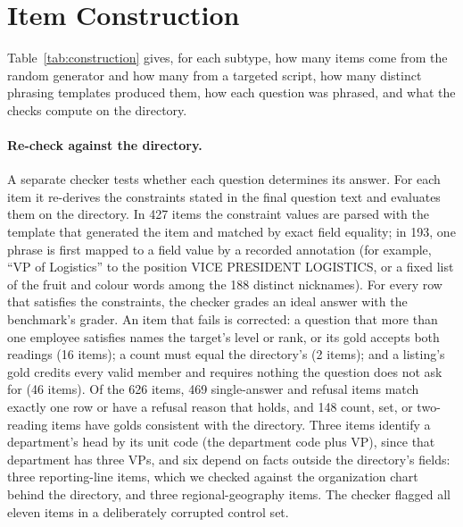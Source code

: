 \documentclass[11pt]{article}
\begin{document}
\section{Item Construction}
\label{app:construction}

Table~\ref{tab:construction} gives, for each subtype, how many items come from the random generator and
how many from a targeted script, how many distinct phrasing templates produced them, how each question
was phrased, and what the checks compute on the directory.

\paragraph{Re-check against the directory.} A separate checker tests whether each question determines its
answer. For each item it re-derives the constraints stated in the final question text and evaluates them
on the directory. In 427 items the constraint values are parsed with the template that generated the
item and matched by exact field equality; in 193, one phrase is first mapped to a field value by a
recorded annotation (for example, ``VP of Logistics'' to the position VICE PRESIDENT LOGISTICS, or a fixed
list of the fruit and colour words among the 188 distinct nicknames). For every row that satisfies the
constraints, the checker grades an ideal answer with the benchmark's grader. An item that fails is corrected:
a question that more than one employee satisfies names the target's level or rank, or its gold accepts
both readings (16 items); a count must equal the directory's (2 items); and a listing's gold credits every
valid member and requires nothing the question does not ask for (46 items). Of the 626 items, 469
single-answer and refusal items match exactly one row or have a refusal reason
that holds, and 148 count, set, or two-reading items have golds consistent with the directory. Three
items identify a department's head by its unit code (the department code plus VP), since that department
has three VPs, and six depend on facts outside the directory's fields: three reporting-line items, which
we checked against the organization chart behind the directory, and three regional-geography items. The
checker flagged all eleven items in a deliberately corrupted control set.
\end{document}
